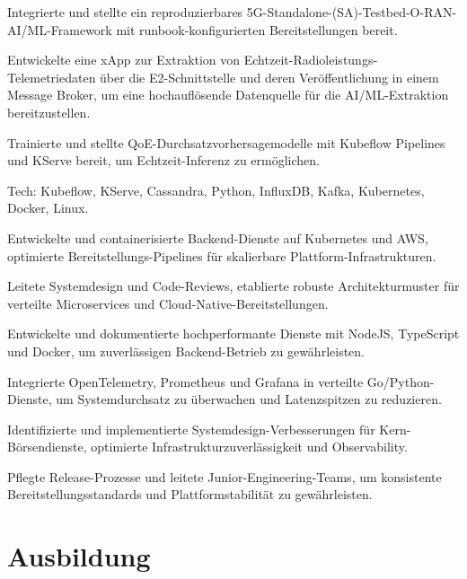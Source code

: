 \documentclass[10pt,a4paper]{resume}
\begin{document}
\bullets
  \item Integrierte und stellte ein reproduzierbares 5G-Standalone-(SA)-Testbed-O-RAN-AI/ML-Framework mit runbook-konfigurierten Bereitstellungen bereit.
  \item Entwickelte eine xApp zur Extraktion von Echtzeit-Radioleistungs-Telemetriedaten über die E2-Schnittstelle und deren Veröffentlichung in einem Message Broker, um eine hochauflösende Datenquelle für die AI/ML-Extraktion bereitzustellen.
  \item Trainierte und stellte QoE-Durchsatzvorhersagemodelle mit Kubeflow Pipelines und KServe bereit, um Echtzeit-Inferenz zu ermöglichen.
  \item Tech: Kubeflow, KServe, Cassandra, Python, InfluxDB, Kafka, Kubernetes, Docker, Linux.
\bulletsend
\vspace{1.5pt}
\bullets
  \item Entwickelte und containerisierte Backend-Dienste auf Kubernetes und AWS, optimierte Bereitstellungs-Pipelines für skalierbare Plattform-Infrastrukturen.
  \item Leitete Systemdesign und Code-Reviews, etablierte robuste Architekturmuster für verteilte Microservices und Cloud-Native-Bereitstellungen.
  \item Entwickelte und dokumentierte hochperformante Dienste mit NodeJS, TypeScript und Docker, um zuverlässigen Backend-Betrieb zu gewährleisten.
\bulletsend
\vspace{1.5pt}
\bullets
  \item Integrierte OpenTelemetry, Prometheus und Grafana in verteilte Go/Python-Dienste, um Systemdurchsatz zu überwachen und Latenzspitzen zu reduzieren.
  \item Identifizierte und implementierte Systemdesign-Verbesserungen für Kern-Börsendienste, optimierte Infrastrukturzuverlässigkeit und Observability.
  \item Pflegte Release-Prozesse und leitete Junior-Engineering-Teams, um konsistente Bereitstellungsstandards und Plattformstabilität zu gewährleisten.
\bulletsend
\vspace{1.5pt}

\section{Ausbildung}
\end{document}
